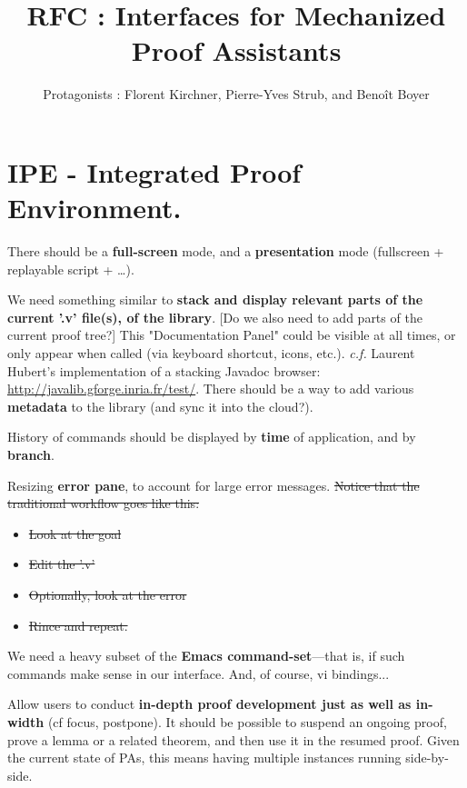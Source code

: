 \documentclass[11pt,a4paper]{article}
\begin{document}
\title{RFC : Interfaces for Mechanized Proof Assistants}
\author{Protagonists : Florent {\sc Kirchner},
  Pierre-Yves {\sc Strub}, and Benoît {\sc Boyer}}
\maketitle


\noindent{\large[SCRATCHPAD]}

\section*{IPE - Integrated Proof Environment.}


There should be a {\bf full-screen} mode, and a {\bf presentation} mode
(fullscreen + replayable script + \dots).

We need something similar to {\bf stack and display relevant parts of the
current '.v' file(s), of the library}. [Do we also need to add parts of
the current proof tree?] This "Documentation Panel" could be visible
at all times, or only appear when called (via keyboard shortcut,
icons, etc.). {\it c.f.} Laurent Hubert's implementation of a stacking
Javadoc browser: \url{http://javalib.gforge.inria.fr/test/}. There
should be a way to add various {\bf metadata} to the library (and sync it
into the cloud?).


History of commands should be displayed by {\bf time} of application, and by
{\bf branch}.


Resizing {\bf error pane}, to account for large error messages. \sout{Notice that
the traditional workflow goes like this:}

\begin{itemize}
\item \sout{Look at the goal}
\item \sout{Edit the '.v'}
\item \sout{Optionally, look at the error}
\item \sout{Rince and repeat.} 
\end{itemize}



We need a heavy subset of the {\bf Emacs command-set}---that is, if such
commands make sense in our interface. And, of course, vi bindings...


Allow users to conduct {\bf in-depth proof development just as well as
in-width} (cf focus, postpone). It should be possible to suspend an
ongoing proof, prove a lemma or a related theorem, and then use it in
the resumed proof. Given the current state of PAs, this means having
multiple instances running side-by-side.
\end{document}
